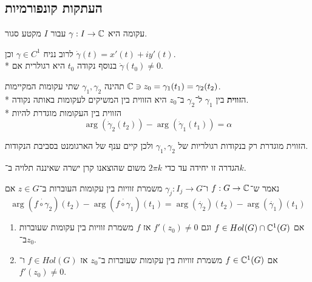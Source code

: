 \subsection{העתקות קונפורמיות}
\begin{definition}[עקומה]
	עקומה היא $\gamma : I \to \mathbb{C}$ עבור $I$ מקטע סגור.
\end{definition}
לרוב נניח $\gamma \in C^1$ וכן $\dot{\gamma}(t) = x'(t) + i y'(t)$. \\*
בנוסף נקודה $t_0$ היא רגולרית אם $\dot{\gamma}(t_0) \ne 0$.
\begin{definition}[זוויות]
	תהינה $\gamma_1, \gamma_2$ שתי עקומות המקיימות $\mathbb{C} \ni z_0 = \gamma_1(t_1) = \gamma_2(t_2)$. \\*
	ה\textbf{זווית} בין $\gamma_1$ ל־$\gamma_2$ ב־$z_0$ היא הזווית בין המשיקים לעקומות באותה נקודה. \\*
	הזווית בין העקומות מוגדרת להיות
	\[
		\arg(\dot{\gamma}_2(t_2)) - \arg(\dot{\gamma}_1(t_1)) = \alpha
	\]
\end{definition}
\begin{remark}
	הזווית מוגדרת רק בנקודות רגולריות של $\gamma_1, \gamma_2$ ולכן קיים ענף של הארגומנט בסביבת הנקודות.
\end{remark}
\begin{remark}
	הגדרה זו יחידה עד כדי $2\pi k$ משום שהוצאנו קרן ישרה שאיננה תלויה ב־$k$.
\end{remark}
\begin{definition}
	נאמר ש־$f : G \to \mathbb{C}$ ו־$\gamma_j : I_j \to G$ משמרת זוויות בין עקומות העוברות ב־$z \in G$ אם
	\[
		\arg(\dot{f \circ \gamma_2})(t_2) - \arg(\dot{f \circ \gamma_1})(t_1)
		= \arg(\dot{\gamma_2})(t_2) - \arg(\dot{\gamma_1})(t_1)
	\]
\end{definition}
\begin{theorem}
	\begin{enumerate}
		\item אם $f \in Hol(G) \cap \mathbb{C}^1(G)$ וגם $f'(z_0) \ne 0$ אז $f$ משמרת זוויות בין עקומות שעוברות ב־$z_0$.
		\item אם $f \in \mathbb{C}^1(G)$ משמרת זוויות בין עקומות שעוברות ב־$z_0$ אז $f \in Hol(G)$ ו־$f'(z_0) \ne 0$.
	\end{enumerate}
\end{theorem}
